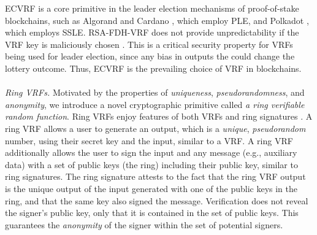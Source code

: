 ECVRF is a core primitive in the leader election mechanisms of proof-of-stake blockchains, such as Algorand \cite{ChenM19} and Cardano \cite{KiayiasRDO17,DavidGKR17}, which employ PLE, and Polkadot \cite{BurdgesASV23a}, which employs SSLE.
RSA-FDH-VRF does not provide unpredictability if the VRF key is maliciously chosen \cite{VRF-RFC}. This is a critical security property for VRFs being used for leader election, since any bias in outputs the could change the lottery outcome.  Thus, ECVRF is the prevailing choice of VRF in blockchains.
%
%
\\\\
\noindent \emph{Ring VRFs.} Motivated by the properties of \emph{uniqueness}, \emph{pseudorandomness}, and \emph{anonymity}, we introduce a novel cryptographic primitive called \emph{a ring verifiable random function}.  Ring VRFs enjoy features of both VRFs \cite{vrf_micali}  and ring signatures \cite{ring_accountable,ring_efficient,ring_linkable,ring_noRO,ring_sublinear}. A ring VRF allows a user to generate an output, which is a \emph{unique}, \emph{pseudorandom} number, using their secret key and the input, similar to a VRF.  A ring VRF additionally allows the user to sign the input and any message (e.g., auxiliary data)  with a set of public keys (the ring) including their public key, similar to ring signatures. The ring signature attests to the fact that the ring VRF output is the unique output of the input generated with one of the public keys in the ring, and that the same key also signed the message. Verification does not reveal the signer's public key, only that it is contained in the set of public keys.
This guarantees the \emph{anonymity} of the signer within the set of potential signers.

